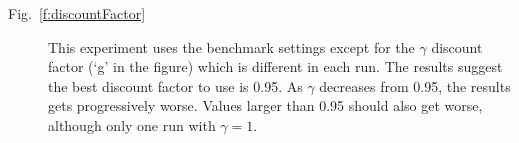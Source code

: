\begin{description}
\item[Fig.~\ref{f:discountFactor}]
This experiment uses the benchmark settings except for the $\gamma$
discount factor (`g' in the figure) which is different in each run.
The results suggest the best discount factor to use is 0.95. As
$\gamma$ decreases from 0.95, the results gets progressively worse.
Values larger than 0.95 should also get worse, although only one run with $\gamma = 1$.

\end{description}

